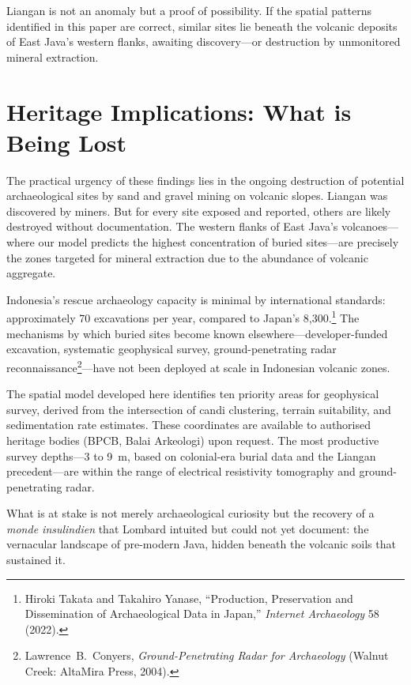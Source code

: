 \documentclass[12pt,a4paper]{article}
\begin{document}
Liangan is not an anomaly but a proof of possibility.
If the spatial patterns identified in this paper are correct, similar sites lie beneath the volcanic deposits of East Java's western flanks, awaiting discovery---or destruction by unmonitored mineral extraction.


\section{Heritage Implications: What is Being Lost}

The practical urgency of these findings lies in the ongoing destruction of potential archaeological sites by sand and gravel mining on volcanic slopes.
Liangan was discovered by miners.
But for every site exposed and reported, others are likely destroyed without documentation.
The western flanks of East Java's volcanoes---where our model predicts the highest concentration of buried sites---are precisely the zones targeted for mineral extraction due to the abundance of volcanic aggregate.

Indonesia's rescue archaeology capacity is minimal by international standards: approximately 70 excavations per year, compared to Japan's 8,300.\footnote{Hiroki Takata and Takahiro Yanase, ``Production, Preservation and Dissemination of Archaeological Data in Japan,'' \emph{Internet Archaeology} 58 (2022).}
The mechanisms by which buried sites become known elsewhere---developer-funded excavation, systematic geophysical survey, ground-penetrating radar reconnaissance\footnote{Lawrence~B.\ Conyers, \emph{Ground-Penetrating Radar for Archaeology} (Walnut Creek: AltaMira Press, 2004).}---have not been deployed at scale in Indonesian volcanic zones.

The spatial model developed here identifies ten priority areas for geophysical survey, derived from the intersection of candi clustering, terrain suitability, and sedimentation rate estimates.
These coordinates are available to authorised heritage bodies (BPCB, Balai Arkeologi) upon request.
The most productive survey depths---3 to 9~m, based on colonial-era burial data and the Liangan precedent---are within the range of electrical resistivity tomography and ground-penetrating radar.

What is at stake is not merely archaeological curiosity but the recovery of a \emph{monde insulindien} that Lombard intuited but could not yet document: the vernacular landscape of pre-modern Java, hidden beneath the volcanic soils that sustained it.
\end{document}
